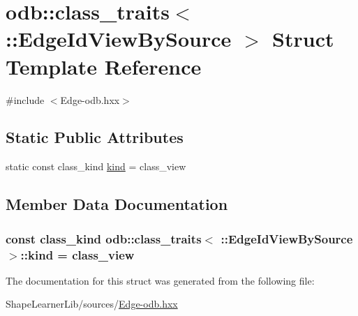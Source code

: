\hypertarget{structodb_1_1class__traits_3_01_1_1_edge_id_view_by_source_01_4}{}\section{odb\+:\+:class\+\_\+traits$<$ \+:\+:Edge\+Id\+View\+By\+Source $>$ Struct Template Reference}
\label{structodb_1_1class__traits_3_01_1_1_edge_id_view_by_source_01_4}


{\ttfamily \#include $<$Edge-\/odb.\+hxx$>$}

\subsection*{Static Public Attributes}
\begin{DoxyCompactItemize}
\item 
static const class\+\_\+kind \hyperlink{structodb_1_1class__traits_3_01_1_1_edge_id_view_by_source_01_4_ace97fb553c1f5528ae338b3ba332fdd2}{kind} = class\+\_\+view
\end{DoxyCompactItemize}


\subsection{Member Data Documentation}
\hypertarget{structodb_1_1class__traits_3_01_1_1_edge_id_view_by_source_01_4_ace97fb553c1f5528ae338b3ba332fdd2}{}
\subsubsection[{kind}]{\setlength{\rightskip}{0pt plus 5cm}const class\+\_\+kind odb\+::class\+\_\+traits$<$ \+::{\bf Edge\+Id\+View\+By\+Source} $>$\+::kind = class\+\_\+view\hspace{0.3cm}{\ttfamily [static]}}\label{structodb_1_1class__traits_3_01_1_1_edge_id_view_by_source_01_4_ace97fb553c1f5528ae338b3ba332fdd2}


The documentation for this struct was generated from the following file\+:\begin{DoxyCompactItemize}
\item 
Shape\+Learner\+Lib/sources/\hyperlink{_edge-odb_8hxx}{Edge-\/odb.\+hxx}\end{DoxyCompactItemize}
